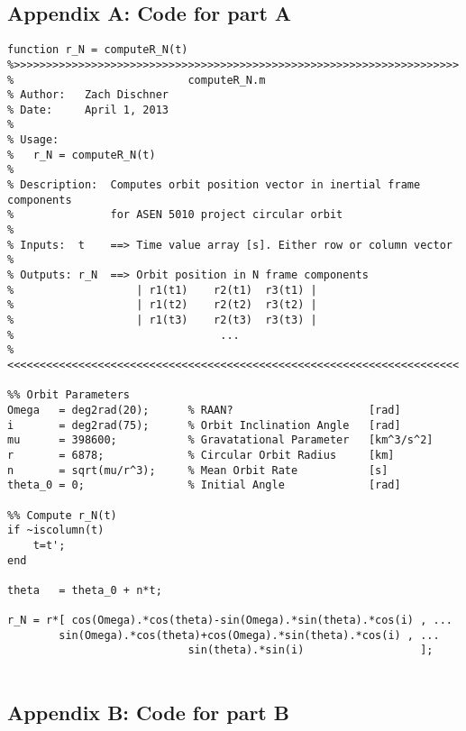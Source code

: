 \documentclass[]{aiaa-tc}%
\begin{document}
\subsection{Appendix A: Code for part A}
\label{APP:Code for Part A}
\begin{lstlisting}
function r_N = computeR_N(t)
%>>>>>>>>>>>>>>>>>>>>>>>>>>>>>>>>>>>>>>>>>>>>>>>>>>>>>>>>>>>>>>>>>>>>> 
%                           computeR_N.m
% Author:   Zach Dischner
% Date:     April 1, 2013
% 
% Usage:
%   r_N = computeR_N(t)
%
% Description:  Computes orbit position vector in inertial frame components
%               for ASEN 5010 project circular orbit
% 
% Inputs:  t    ==> Time value array [s]. Either row or column vector
%
% Outputs: r_N  ==> Orbit position in N frame components
%                   | r1(t1)    r2(t1)  r3(t1) |
%                   | r1(t2)    r2(t2)  r3(t2) |
%                   | r1(t3)    r2(t3)  r3(t3) |
%                                ...
%<<<<<<<<<<<<<<<<<<<<<<<<<<<<<<<<<<<<<<<<<<<<<<<<<<<<<<<<<<<<<<<<<<<<<<

%% Orbit Parameters
Omega   = deg2rad(20);      % RAAN?                     [rad]
i       = deg2rad(75);      % Orbit Inclination Angle   [rad]
mu      = 398600;           % Gravatational Parameter   [km^3/s^2]
r       = 6878;             % Circular Orbit Radius     [km]
n       = sqrt(mu/r^3);     % Mean Orbit Rate           [s]
theta_0 = 0;                % Initial Angle             [rad]

%% Compute r_N(t)
if ~iscolumn(t)
    t=t';
end

theta   = theta_0 + n*t;

r_N = r*[ cos(Omega).*cos(theta)-sin(Omega).*sin(theta).*cos(i) , ...
        sin(Omega).*cos(theta)+cos(Omega).*sin(theta).*cos(i) , ...
                            sin(theta).*sin(i)                  ];
        
\end{lstlisting}




\subsection{Appendix B: Code for part B}
\end{document}
